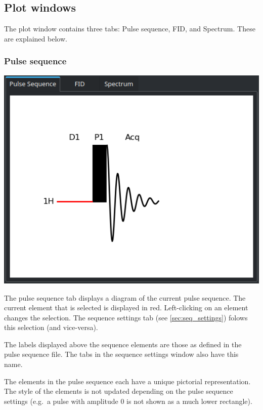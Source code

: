 \documentclass[11pt,a4paper]{article}
\begin{document}
\subsection{Plot windows}
The plot window contains three tabs: Pulse sequence, FID, and Spectrum. These are explained below.
\subsubsection{Pulse sequence}
\begin{center}
\includegraphics[width=0.9\linewidth]{images/Plot_sequence.png}
\end{center}
The pulse sequence tab displays a diagram of the current pulse sequence. The current element that is selected is displayed in red. Left-clicking on an element changes the selection. The sequence settings tab (see \autoref{sec:seq_settings}) folows this selection (and vice-versa).

The labels displayed above the sequence elements are those as defined in the pulse sequence file. The tabs in the sequence settings window also have this name.

The elements in the pulse sequence each have a unique pictorial representation. The style of the elements is not updated depending on the pulse sequence settings (e.g.\ a pulse with amplitude 0 is not shown as a much lower rectangle).
\end{document}
